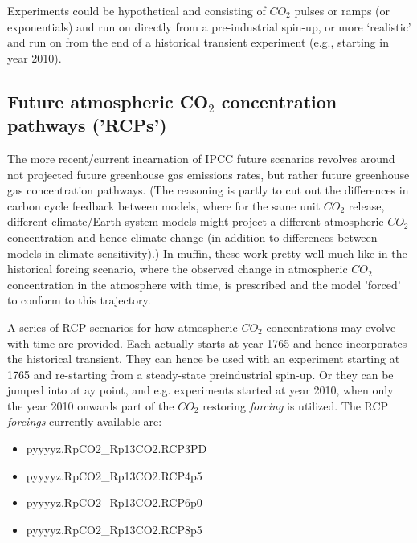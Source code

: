 \documentclass[11pt,fleqn]{book} %
\begin{document}
\vspace{1mm}
Experiments could be hypothetical and consisting of \(CO_{2}\) pulses or ramps (or exponentials) and run on directly from a pre-industrial spin-up, or more ‘realistic’ and run on from the end of a historical transient experiment (e.g., starting in year 2010).


\subsection{Future atmospheric CO$_{2}$ concentration pathways ('RCPs')}

The more recent/current incarnation of IPCC future scenarios revolves around not projected future greenhouse gas emissions rates, but rather future greenhouse gas concentration pathways. (The reasoning is partly to cut out the differences in carbon cycle feedback between models, where for the same unit \(CO_{2}\) release, different climate/Earth system models might project a different atmospheric \(CO_{2}\) concentration and hence climate change (in addition to differences between models in climate sensitivity).) In muffin, these work pretty well much like in the historical forcing scenario, where the observed change in atmospheric \(CO_{2}\) concentration in the atmosphere with time, is prescribed and the model 'forced' to conform to this trajectory.

A series of RCP scenarios for how atmospheric \(CO_{2}\) concentrations may evolve with time are provided. Each actually starts at year 1765 and hence incorporates the historical transient. They can hence be used with an experiment starting at 1765 and re-starting from a steady-state preindustrial spin-up. Or they can be jumped into at ay point, and e.g. experiments started at year 2010, when only the year 2010 onwards part of the \(CO_{2}\) restoring \textit{forcing} is utilized. The RCP \textit{forcings} currently available are:

\vspace{2pt}
\begin{itemize}[noitemsep]
\setlength{\itemindent}{.2in}
\item \textsf{\footnotesize pyyyyz.RpCO2\_Rp13CO2.RCP3PD}
\item \textsf{\footnotesize pyyyyz.RpCO2\_Rp13CO2.RCP4p5}
\item \textsf{\footnotesize pyyyyz.RpCO2\_Rp13CO2.RCP6p0}
\item \textsf{\footnotesize pyyyyz.RpCO2\_Rp13CO2.RCP8p5}
\end{itemize}
\vspace{2pt}
\end{document}
